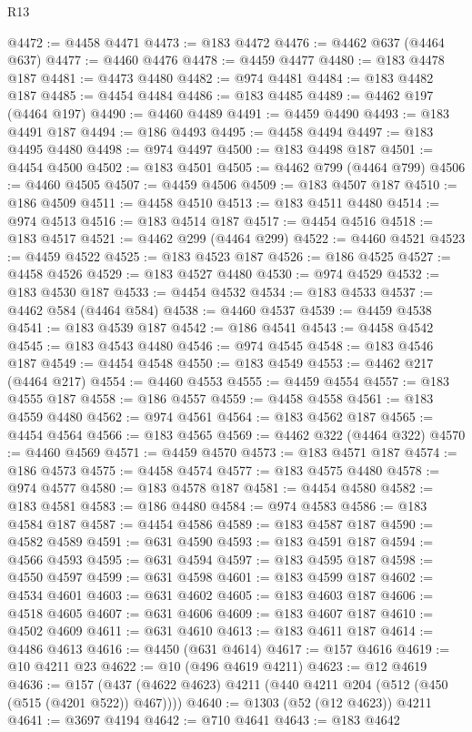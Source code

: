 \begin{lexlean}{R13}
\begin{coremodule}
@4472 := @4458 @4471
@4473 := @183 @4472
@4476 := @4462 @637 (@4464 @637)
@4477 := @4460 @4476
@4478 := @4459 @4477
@4480 := @183 @4478 @187
@4481 := @4473 @4480
@4482 := @974 @4481
@4484 := @183 @4482 @187
@4485 := @4454 @4484
@4486 := @183 @4485
@4489 := @4462 @197 (@4464 @197)
@4490 := @4460 @4489
@4491 := @4459 @4490
@4493 := @183 @4491 @187
@4494 := @186 @4493
@4495 := @4458 @4494
@4497 := @183 @4495 @4480
@4498 := @974 @4497
@4500 := @183 @4498 @187
@4501 := @4454 @4500
@4502 := @183 @4501
@4505 := @4462 @799 (@4464 @799)
@4506 := @4460 @4505
@4507 := @4459 @4506
@4509 := @183 @4507 @187
@4510 := @186 @4509
@4511 := @4458 @4510
@4513 := @183 @4511 @4480
@4514 := @974 @4513
@4516 := @183 @4514 @187
@4517 := @4454 @4516
@4518 := @183 @4517
@4521 := @4462 @299 (@4464 @299)
@4522 := @4460 @4521
@4523 := @4459 @4522
@4525 := @183 @4523 @187
@4526 := @186 @4525
@4527 := @4458 @4526
@4529 := @183 @4527 @4480
@4530 := @974 @4529
@4532 := @183 @4530 @187
@4533 := @4454 @4532
@4534 := @183 @4533
@4537 := @4462 @584 (@4464 @584)
@4538 := @4460 @4537
@4539 := @4459 @4538
@4541 := @183 @4539 @187
@4542 := @186 @4541
@4543 := @4458 @4542
@4545 := @183 @4543 @4480
@4546 := @974 @4545
@4548 := @183 @4546 @187
@4549 := @4454 @4548
@4550 := @183 @4549
@4553 := @4462 @217 (@4464 @217)
@4554 := @4460 @4553
@4555 := @4459 @4554
@4557 := @183 @4555 @187
@4558 := @186 @4557
@4559 := @4458 @4558
@4561 := @183 @4559 @4480
@4562 := @974 @4561
@4564 := @183 @4562 @187
@4565 := @4454 @4564
@4566 := @183 @4565
@4569 := @4462 @322 (@4464 @322)
@4570 := @4460 @4569
@4571 := @4459 @4570
@4573 := @183 @4571 @187
@4574 := @186 @4573
@4575 := @4458 @4574
@4577 := @183 @4575 @4480
@4578 := @974 @4577
@4580 := @183 @4578 @187
@4581 := @4454 @4580
@4582 := @183 @4581
@4583 := @186 @4480
@4584 := @974 @4583
@4586 := @183 @4584 @187
@4587 := @4454 @4586
@4589 := @183 @4587 @187
@4590 := @4582 @4589
@4591 := @631 @4590
@4593 := @183 @4591 @187
@4594 := @4566 @4593
@4595 := @631 @4594
@4597 := @183 @4595 @187
@4598 := @4550 @4597
@4599 := @631 @4598
@4601 := @183 @4599 @187
@4602 := @4534 @4601
@4603 := @631 @4602
@4605 := @183 @4603 @187
@4606 := @4518 @4605
@4607 := @631 @4606
@4609 := @183 @4607 @187
@4610 := @4502 @4609
@4611 := @631 @4610
@4613 := @183 @4611 @187
@4614 := @4486 @4613
@4616 := @4450 (@631 @4614)
@4617 := @157 @4616
@4619 := @10 @4211 @23
@4622 := @10 (@496 @4619 @4211)
@4623 := @12 @4619
@4636 := @157 (@437 (@4622 @4623) @4211 (@440 @4211 @204 (@512 (@450 (@515 (@4201 @522)) @467))))
@4640 := @1303 (@52 (@12 @4623)) @4211
@4641 := @3697 @4194
@4642 := @710 @4641
@4643 := @183 @4642

\end{coremodule}
\end{lexlean}
